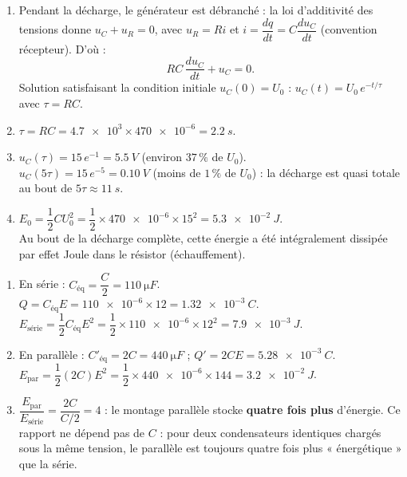 \documentclass[11pt]{article}
\begin{document}
\begin{corrige}
\begin{enumerate}
\item Pendant la décharge, le générateur est débranché : la loi d'additivité des tensions donne $u_C + u_R = 0$, avec $u_R = Ri$ et $i = \dfrac{dq}{dt} = C\dfrac{du_C}{dt}$ (convention récepteur). D'où :
\[ RC\,\dfrac{du_C}{dt} + u_C = 0. \]
Solution satisfaisant la condition initiale $u_C(0) = U_0$ : $u_C(t) = U_0\,e^{-t/\tau}$ avec $\tau = RC$.
\item $\tau = RC = \num{4,7e3}\times \num{470e-6} = \SI{2,2}{s}$.
\item $u_C(\tau) = 15\,e^{-1} = \SI{5,5}{V}$ (environ $37\,\%$ de $U_0$).\\
$u_C(5\tau) = 15\,e^{-5} = \SI{0,10}{V}$ (moins de $1\,\%$ de $U_0$) : la décharge est quasi totale au bout de $5\tau \approx \SI{11}{s}$.
\item $E_0 = \dfrac{1}{2}CU_0^2 = \dfrac{1}{2}\times \num{470e-6}\times 15^2 = \SI{5,3e-2}{J}$.\\
Au bout de la décharge complète, cette énergie a été intégralement dissipée par effet Joule dans le résistor (échauffement).
\end{enumerate}
\end{corrige}

\begin{corrige}
\begin{enumerate}
\item En série : $C_{\text{éq}} = \dfrac{C}{2} = \SI{110}{\micro F}$.\\
$Q = C_{\text{éq}}E = \num{110e-6}\times 12 = \SI{1,32e-3}{C}$.\\
$E_{\text{série}} = \dfrac{1}{2}C_{\text{éq}}E^2 = \dfrac{1}{2}\times \num{110e-6}\times 12^2 = \SI{7,9e-3}{J}$.
\item En parallèle : $C'_{\text{éq}} = 2C = \SI{440}{\micro F}$ ; $Q' = 2CE = \SI{5,28e-3}{C}$.\\
$E_{\text{par}} = \dfrac{1}{2}(2C)E^2 = \dfrac{1}{2}\times \num{440e-6}\times 144 = \SI{3,2e-2}{J}$.
\item $\dfrac{E_{\text{par}}}{E_{\text{série}}} = \dfrac{2C}{C/2} = 4$ : le montage parallèle stocke \textbf{quatre fois plus} d'énergie. Ce rapport ne dépend pas de $C$ : pour deux condensateurs identiques chargés sous la même tension, le parallèle est toujours quatre fois plus « énergétique » que la série.
\end{enumerate}
\end{corrige}
\end{document}
